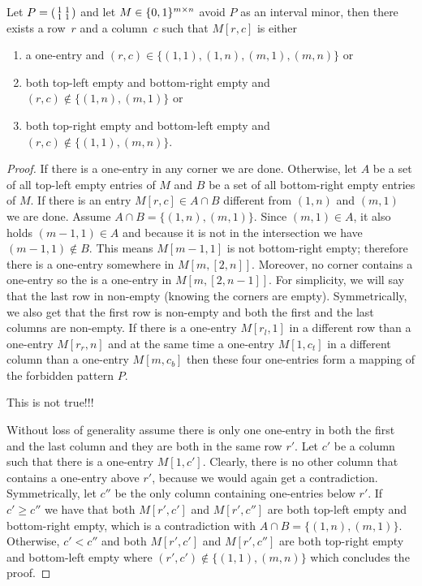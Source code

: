 \begin{lemma}
\label{lemma1}
Let $P=\left(\begin{smallmatrix}1&1\\1&1\end{smallmatrix}\right)$ and let $M\in\{0,1\}^{m\times n}$ avoid $P$ as an interval minor, then there exists a row~$r$ and a column~$c$ such that $M[r,c]$ is either
\begin{enumerate}
\item a one-entry and $(r,c)\in\{(1,1),(1,n),(m,1),(m,n)\}$ or
\item both top-left empty and bottom-right empty and $(r,c)\not\in\{(1,n),(m,1)\}$ or
\item both top-right empty and bottom-left empty and $(r,c)\not\in\{(1,1),(m,n)\}$.
\end{enumerate}
\end{lemma}
\begin{proof}
If there is a one-entry in any corner we are done. Otherwise, let $A$ be a set of all top-left empty entries of $M$ and $B$ be a set of all bottom-right empty entries of $M$. If there is an entry $M[r,c]\in A\cap B$ different from $(1,n)$ and $(m,1)$ we are done. Assume $A\cap B=\{(1,n),(m,1)\}$. Since $(m,1)\in A$, it also holds $(m-1,1)\in A$ and because it is not in the intersection we have $(m-1,1)\not\in B$. This means $M[m-1,1]$ is not bottom-right empty; therefore there is a one-entry somewhere in $M[{m},[2,n]]$. Moreover, no corner contains a one-entry so the is a one-entry in $M[{m},[2,n-1]]$. For simplicity, we will say that the last row in non-empty (knowing the corners are empty). Symmetrically, we also get that the first row is non-empty and both the first and the last columns are non-empty. If there is a one-entry $M[r_l,1]$ in a different row than a one-entry $M[r_r,n]$ and at the same time a one-entry $M[1,c_t]$ in a different column than a one-entry $M[m,c_b]$ then these four one-entries form a mapping of the forbidden pattern $P$.

This is not true!!!

Without loss of generality assume there is only one one-entry in both the first and the last column and they are both in the same row $r'$. Let $c'$ be a column such that there is a one-entry $M[1,c']$. Clearly, there is no other column that contains a one-entry above $r'$, because we would again get a contradiction. Symmetrically, let $c''$ be the only column containing one-entries below $r'$. If $c'\geq c''$ we have that both $M[r',c']$ and $M[r',c'']$ are both top-left empty and bottom-right empty, which is a contradiction with $A\cap B=\{(1,n),(m,1)\}$. Otherwise, $c'<c''$ and both $M[r',c']$ and $M[r',c'']$ are both top-right empty and bottom-left empty where $(r',c')\not\in\{(1,1),(m,n)\}$ which concludes the proof.
\end{proof}

